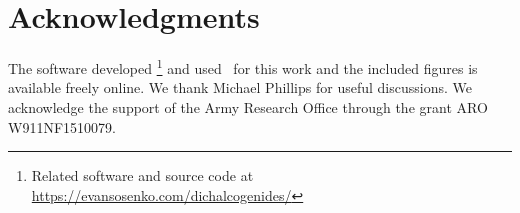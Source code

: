 \section{Acknowledgments}

The software developed %
\footnote{%
  Related software and source code at \\
  \url{https://evansosenko.com/dichalcogenides/}
}
and used~\cite{Hunter:2007} for this work
and the included figures is available freely online.
We thank Michael Phillips for useful discussions.
We acknowledge the support of the Army Research Office through the grant
ARO W911NF1510079.
